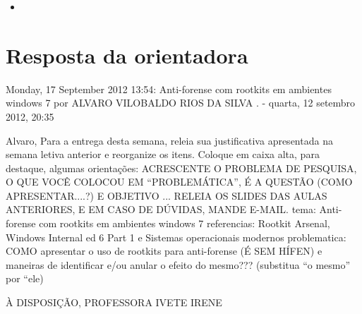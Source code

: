 \begin{itemize}
	\item 
\end{itemize}

\section{Resposta da orientadora}
Monday, 17 September 2012
13:54: Anti-forense com rootkits em ambientes windows 7
por ALVARO VILOBALDO RIOS DA SILVA . - quarta, 12 setembro 2012, 20:35

Alvaro,
Para a entrega desta semana, releia sua justificativa apresentada na semana letiva anterior e reorganize os itens. Coloque em caixa alta, para destaque, algumas orientações:
ACRESCENTE O PROBLEMA DE PESQUISA, O QUE VOCÊ COLOCOU EM “PROBLEMÁTICA”, É A QUESTÃO (COMO APRESENTAR....?) E OBJETIVO ...
RELEIA OS SLIDES DAS AULAS ANTERIORES, E EM CASO DE DÚVIDAS, MANDE E-MAIL.
tema: Anti-forense com rootkits em ambientes windows 7
referencias: Rootkit Arsenal, Windows Internal ed 6 Part 1 e Sistemas operacionais modernos problematica: COMO apresentar o uso de rootkits para anti-forense (É SEM HÍFEN) e maneiras de identificar e/ou anular o efeito do mesmo??? (substitua “o mesmo” por “ele)

À DISPOSIÇÃO,
PROFESSORA IVETE IRENE 

